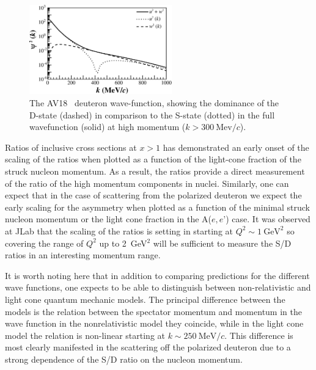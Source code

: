 \begin{figure}
\begin{center}
\includegraphics[width=0.55\textwidth]{figs/sd_wf_av18.eps}
\caption{\label{sd-wf} The AV18~\cite{PhysRevC.84.034003} deuteron wave-function, showing the dominance of the D-state (dashed) in comparison to the S-state (dotted) in the full wavefunction (solid) at high momentum ($k>300\mathrm{~Mev}/c$).}
\end{center}
\end{figure}

Ratios of inclusive cross sections at $x>1$ has demonstrated an early onset of the scaling of the ratios when plotted as a function of the light-cone fraction of the struck nucleon momentum.  As a result, the ratios provide a direct measurement of the ratio of the high momentum components in nuclei.  Similarly, one can expect that in the case of scattering from the polarized deuteron we expect the early scaling for the asymmetry when plotted as a function of the minimal struck nucleon momentum or the light cone fraction in the A($e,e’$) case.
It was observed at JLab that the scaling of the ratios is setting in starting at $Q^2 \sim 1 \mathrm{~GeV}^2$ so covering the range of $Q^2$ up to 2~GeV$^2$ will be sufficient to  measure the S/D ratios in an interesting momentum range. 







It is worth noting here that in addition to comparing predictions for the different wave functions, one expects to be able to distinguish between non-relativistic and light cone quantum mechanic models.  The principal difference between the models is the relation between the spectator momentum and momentum in the wave function in the nonrelativistic model they coincide, while in the light cone model the relation is non-linear starting at $k \sim 250 \mathrm{~MeV}/c$. This difference is most clearly manifested in the scattering off the polarized deuteron due to a strong dependence of the S/D ratio on the nucleon momentum.